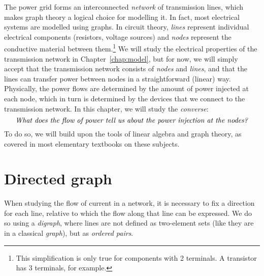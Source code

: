 \documentclass[main.tex]{subfiles}
\begin{document}

The power grid forms an interconnected \emph{network} of transmission lines, which makes graph theory a logical choice for modelling it.
In fact, most electrical systems are modelled using graphs. In circuit theory, \emph{lines} represent individual electrical components (resistors, voltage sources) and \emph{nodes} represent the conductive material between them.\footnote{This simplification is only true for components with 2 terminals. A transistor has 3 terminals, for example.}
We will study the electrical properties of the transmission network in Chapter~\ref{chap:model}, but for now, we will simply accept that the transmission network consists of \emph{nodes} and \emph{lines}, and that the lines can transfer power between nodes in a straightforward (linear) way. Physically, the power flows are determined by the amount of power injected at each node, which in turn is determined by the devices that we connect to the transmission network. In this chapter, we will study the \emph{converse}:
\[
\text{\textit{What does the flow of power tell us about the power injection at the nodes?}}
\]
To do so, we will build upon the tools of linear algebra and graph theory, as covered in most elementary textbooks on these subjects.
\section{Directed graph}
When studying the flow of current in a network, it is necessary to fix a direction for each line, relative to which the flow along that line can be expressed. We do so using a \emph{digraph}, where lines are not defined as two-element sets (like they are in a classical \emph{graph}), but as \emph{ordered pairs}.
\end{document}
